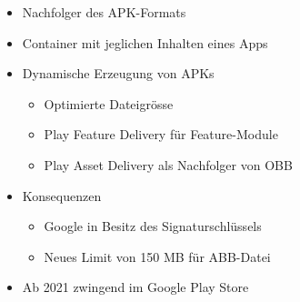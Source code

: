 \begin{itemize}[topsep=0pt, leftmargin=4mm]
    \setlength\itemsep{-0.3em}
    \item Nachfolger des APK-Formats
    \item Container mit jeglichen Inhalten eines Apps
    \item Dynamische Erzeugung von APKs
    \begin{itemize}[topsep=0pt, leftmargin=4mm]
        \setlength\itemsep{-0.3em}
        \item Optimierte Dateigrösse
        \item Play Feature Delivery für Feature-Module
        \item Play Asset Delivery als Nachfolger von OBB
    \end{itemize}
    \item Konsequenzen
    \begin{itemize}[topsep=0pt, leftmargin=4mm]
        \setlength\itemsep{-0.3em}
        \item Google in Besitz des Signaturschlüssels
        \item Neues Limit von 150 MB für ABB-Datei
    \end{itemize}
    \item Ab 2021 zwingend im Google Play Store
\end{itemize}